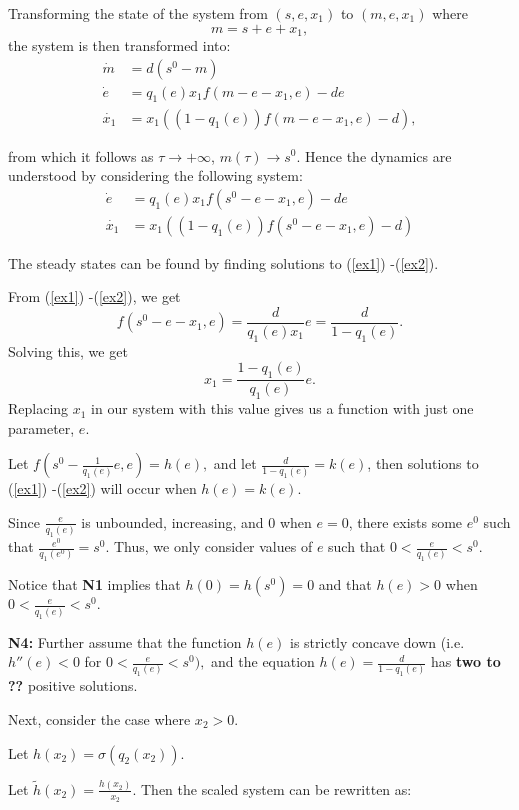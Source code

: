 \documentclass[12pt]{article}
\begin{document}
\noindent Transforming the state of the system from $(s,e,x_1)$ to $(m,e,x_1)$ where $$m=s+e+x_1,$$ the system is then transformed into: 
\begin{align*}
\dot{m}&=d(s^0-m)\\
\dot{e}&=q_1(e) x_1 f(m-e-x_1,e)-de\\
\dot{x_1} &= x_1((1-q_1(e))f(m-e-x_1,e)-d),
\end{align*}

\noindent from which it follows as $\tau \rightarrow +\infty$, $m(\tau ) \rightarrow s^0$. Hence the dynamics are understood by considering the following system: 
\begin{align}
\dot{e}&=q_1(e) x_1 f(s^0-e-x_1,e)-de\label{ex1} \\ 
\dot{x_1} &= x_1((1-q_1(e))f(s^0-e-x_1,e)-d) \label{ex2}
\end{align}

\noindent The steady states can be found by finding solutions to (\ref{ex1}) -(\ref{ex2}). 

\noindent From (\ref{ex1}) -(\ref{ex2}), we get $$f(s^0-e-x_1,e)=\frac{d}{q_1(e)x_1}e = \frac{d}{1-q_1(e)}.$$ Solving this, we get $$x_1=\frac{1-q_1(e)}{q_1(e)}e.$$ Replacing $x_1$ in our system with this value gives us a function with just one parameter, $e$.

\noindent Let $f(s^0-\frac{1}{q_1(e)}e,e) = h(e),$ and let $\frac{d}{1-q_1(e)} = k(e)$, then solutions to (\ref{ex1}) -(\ref{ex2}) will occur when $h(e)=k(e).$

\noindent Since $\frac{e}{q_1(e)}$ is unbounded, increasing, and 0 when $e=0$, there exists some $e^0$ such that $\frac{e^0}{q_1(e^0)}=s^0.$ Thus, we only consider values of $e$ such that $0<\frac{e}{q_1(e)}<s^0.$

\noindent Notice that \textbf{N1} implies that $h(0)=h(s^0)=0$ and that $h(e)>0$ when $0<\frac{e}{q_1(e)}<s^0.$

\noindent \textbf{N4:} Further assume that the function $h(e)$ is strictly concave down (i.e. $h''(e)<0$ for $0<\frac{e}{q_1(e)}<s^0),$ and the equation $h(e)=\frac{d}{1-q_1(e)}$ has \textbf{two to ??} positive solutions. 

\pagebreak

\noindent Next, consider the case where $x_2 >0.$

\noindent Let $h(x_2)=\sigma(q_2(x_2))$. 

\noindent Let $\tilde{h}(x_2) = \frac{h(x_2)}{x_2}.$ Then the scaled system can be rewritten as: 
\end{document}

